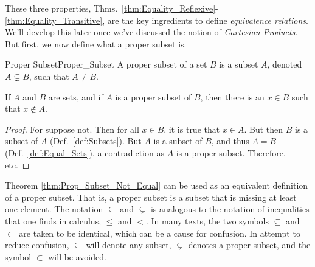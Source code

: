             These three properties,
            Thms.~\ref{thm:Equality_Reflexive}-%
            \ref{thm:Equality_Transitive}, are the key
            ingredients to define \textit{equivalence relations}.
            We'll develop this later once we've discussed the
            notion of \textit{Cartesian Products}. But first, we
            now define what a proper subset is.
            \begin{ldefinition}{Proper Subset}{Proper_Subset}
                A \gls{proper subset} of a set $B$ is a
                subset $A$, denoted $A\subsetneq{B}$, such that
                $A\ne{B}$.
            \end{ldefinition}
            \begin{theorem}
                \label{thm:Prop_Subset_Not_Equal}%
                If $A$ and $B$ are sets, and if $A$ is a proper
                subset of $B$, then there is an $x\in{B}$ such
                that $x\notin{A}$.
            \end{theorem}
            \begin{proof}
                For suppose not. Then for all $x\in{B}$,
                it is true that $x\in{A}$. But then
                $B$ is a subset of $A$ (Def.~\ref{def:Subsets}).
                But $A$ is a subset of $B$, and thus $A=B$
                (Def.~\ref{def:Equal_Sets}), a contradiction as
                $A$ is a proper subset. Therefore, etc.
            \end{proof}
            Theorem \ref{thm:Prop_Subset_Not_Equal} can
            be used as an equivalent definition of a proper
            subset. That is, a proper subset is a subset that
            is missing at least one element. The notation
            $\subseteq$ and $\subsetneq$ is analogous to the
            notation of inequalities that one finds in calculus,
            $\leq$ and $<$. In many texts, the two symbols
            $\subseteq$ and $\subset$ are taken to be identical,
            which can be a cause for confusion. In attempt to
            reduce confusion, $\subseteq$ will denote any subset,
            $\subsetneq$ denotes a proper subset, and the symbol
            $\subset$ will be avoided.
